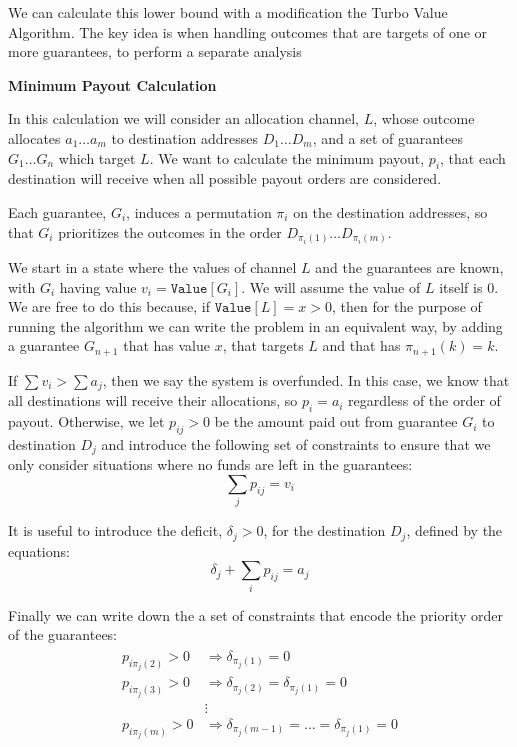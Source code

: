 We can calculate this lower bound with a modification the Turbo Value Algorithm.
The key idea is when handling outcomes that are targets of one or more guarantees, to perform a separate analysis 


\textbf{Minimum Payout Calculation}



In this calculation we will consider an allocation channel, $L$, whose outcome allocates $a_1 \dots a_m$ to destination addresses $D_1 \dots D_m$, and a set of guarantees $G_1 \dots G_n$ which target $L$.
We want to calculate the minimum payout, $p_i$, that each destination will receive when all possible payout orders are considered.

Each guarantee, $G_i$, induces a permutation $\pi_i$ on the destination addresses, so that $G_i$ prioritizes the outcomes in the order $D_{\pi_i(1)} \dots D_{\pi_i(m)}$.

We start in a state where the values of channel $L$ and the guarantees are known, with $G_i$ having value $v_i = \texttt{Value}[G_i]$.
We will assume the value of $L$ itself is 0. 
We are free to do this because, if $\texttt{Value}[L] = x > 0$, then for the purpose of running the algorithm we can write the problem in an equivalent way, by adding a guarantee $G_{n+1}$ that has value $x$, that targets $L$ and that has $\pi_{n+1}(k) = k$.

If $\sum v_i > \sum a_j$, then we say the system is overfunded. 
In this case, we know that all destinations will receive their allocations, so $p_i = a_i$ regardless of the order of payout.
Otherwise, we let $p_{ij} > 0$ be the amount paid out from guarantee $G_i$ to destination $D_j$ and introduce the following set of constraints to ensure that we only consider situations where no funds are left in the guarantees:
\begin{equation}
  \sum_{j} p_{ij} = v_i
\end{equation}

It is useful to introduce the deficit, $\delta_j > 0$, for the destination $D_j$, defined by the equations:
\begin{equation}
  \delta_j + \sum_{i} p_{ij} = a_j
\end{equation}

Finally we can write down the a set of constraints that encode the priority order of the guarantees:
\begin{align}
\begin{split}
  p_{i\pi_j(2)} > 0 &\Rightarrow \delta_{\pi_j(1)} = 0 \\
  p_{i\pi_j(3)} > 0 &\Rightarrow \delta_{\pi_j(2)} = \delta_{\pi_j(1)}  = 0 \\
  &\vdots \\
  p_{i\pi_j(m)} > 0 &\Rightarrow \delta_{\pi_j(m-1)} = \dots = \delta_{\pi_j(1)}  = 0 
\end{split}
\end{align}

